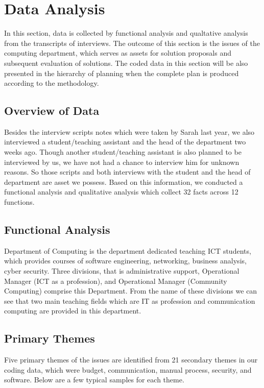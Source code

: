 
\section{Data Analysis}

In this section, data is collected by functional analysis and qualtative analysis from the transcripts of interviews. The outcome of this section is the issues of the computing department, which serves as assets for solution proposals and subsequent evaluation of solutions. The coded data in this section will be also presented in the hierarchy of planning when the complete plan is produced according to the methodology.

\subsection{Overview of Data}

Besides the interview scripts notes which were taken by Sarah last year, we also interviewed a student/teaching assistant and the head of the department two weeks ago. Though another student/teaching assistant is also planned to be interviewed by us, we have not had a chance to interview him for unknown reasons. So those scripts and both interviews with the student and the head of department are asset we possess. Based on this information, we conducted a functional analysis and qualitative analysis which collect 32 facts across 12 functions.

\subsection{Functional Analysis}

Department of Computing is the department dedicated teaching ICT students, which provides courses of software engineering, networking, business analysis, cyber security. Three divisions, that is administrative support, Operational Manager (ICT as a profession), and Operational Manager (Community Computing) comprise this Department. From the name of these divisions we can see that two main teaching fields which are IT as profession and communication computing are provided in this department.

\subsection{Primary Themes}
Five primary themes of the issues are identified from 21 secondary themes in our coding data, which were budget, communication, manual process, security, and software. Below are a few typical samples for each theme.

